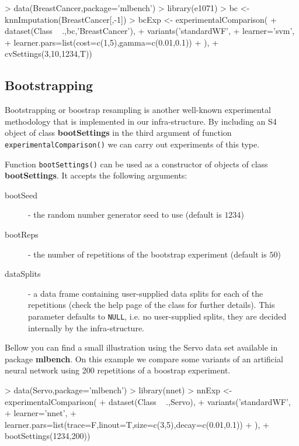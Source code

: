 \documentclass[10pt,a4paper]{article}
\begin{document}
\begin{Schunk}
\begin{Sinput}
> data(BreastCancer,package='mlbench')
> library(e1071)
> bc <- knnImputation(BreastCancer[,-1])
> bcExp <- experimentalComparison(
+   dataset(Class ~ .,bc,'BreastCancer'),
+   variants('standardWF',
+            learner='svm',
+            learner.pars=list(cost=c(1,5),gamma=c(0.01,0.1))
+           ),
+   cvSettings(3,10,1234,T))
\end{Sinput}
\end{Schunk}

\subsection{Bootstrapping}

Bootstrapping or boostrap resampling is another well-known
experimental methodology that is implemented in our
infra-structure. By including an S4 object of class
\textbf{bootSettings} in the third argument of function
\texttt{experimentalComparison()} we can carry out experiments of this
type.

Function \texttt{bootSettings()} can be used as a constructor of
objects of class \textbf{bootSettings}. It accepts the following
arguments:

\begin{description}
\item[bootSeed] - the random number generator seed to use (default is $1234$)
\item[bootReps] - the number of repetitions of the bootstrap experiment (default is $50$)
\item[dataSplits] - a data frame containing user-supplied data splits
  for each of the repetitions (check the help page of the
  class for further details). This parameter defaults to
  \texttt{NULL}, i.e. no user-supplied splits, they are decided
  internally by the infra-structure.
\end{description}

Bellow you can find a small illustration using the Servo data set available in package \textbf{mlbench}. On this example we compare some variants of an artificial neural network using 200 repetitions of a boostrap experiment.

\begin{Schunk}
\begin{Sinput}
> data(Servo,package='mlbench')
> library(nnet)
> nnExp <- experimentalComparison(
+   dataset(Class ~ .,Servo),
+   variants('standardWF',
+            learner='nnet',
+            learner.pars=list(trace=F,linout=T,size=c(3,5),decay=c(0.01,0.1))
+           ),
+   bootSettings(1234,200))
\end{Sinput}
\end{Schunk}
\end{document}
